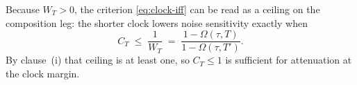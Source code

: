 \noindent
Because $W_T > 0$, the criterion \eqref{eq:clock-iff} can be read as a ceiling on the composition
leg: the shorter clock lowers noise sensitivity exactly when
\[
C_T \;\le\; \frac{1}{W_T} \;=\; \frac{1-\Omega(\tau,T)}{1-\Omega(\tau,T')} .
\]
By clause~(i) that ceiling is at least one, so $C_T \le 1$ is sufficient for attenuation at the
clock margin.
